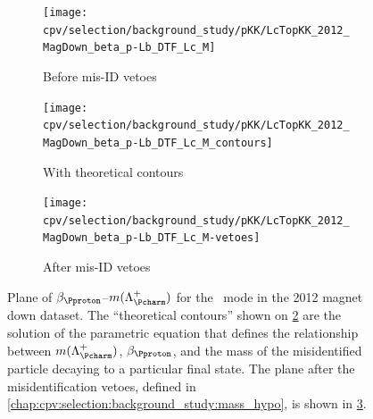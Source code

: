 \begin{figure}
  \begin{subfigure}[b]{0.5\textwidth}
    \texttt{[image: cpv/selection/background\_study/pKK/LcTopKK\_2012\_MagDown\_beta\_p-Lb\_DTF\_Lc\_M]}
    \caption{Before mis-ID vetoes}
    \label{fig:cpv:selection:background_study:mom_asym:pKK:before}
  \end{subfigure}
  \begin{subfigure}[b]{0.5\textwidth}
    \texttt{[image: cpv/selection/background\_study/pKK/LcTopKK\_2012\_MagDown\_beta\_p-Lb\_DTF\_Lc\_M\_contours]}
    \caption{With theoretical contours}
    \label{fig:cpv:selection:background_study:mom_asym:pKK:contours}
  \end{subfigure}
  \begin{subfigure}[b]{0.5\textwidth}
    \texttt{[image: cpv/selection/background\_study/pKK/LcTopKK\_2012\_MagDown\_beta\_p-Lb\_DTF\_Lc\_M-vetoes]}
    \caption{After mis-ID vetoes}
    \label{fig:cpv:selection:background_study:mom_asym:pKK:after}
  \end{subfigure}
  \caption{%
    Plane of $\beta_{\Pproton}$--$m(\PLambdac)$ for the \pKK\ mode in the 2012 
    magnet down dataset.
    The ``theoretical contours'' shown on 
    \cref{fig:cpv:selection:background_study:mom_asym:pKK:contours} are the 
    solution of the parametric equation that defines the relationship between 
    $m(\PLambdac)$, $\beta_{\Pproton}$, and the mass of the misidentified 
    particle decaying to a particular final state.
    The plane after the misidentification vetoes, defined in 
    \cref{chap:cpv:selection:background_study:mass_hypo}, is shown in 
    \cref{fig:cpv:selection:background_study:mom_asym:pKK:after}.
  }
  \label{fig:cpv:selection:background_study:mom_asym:pKK}
\end{figure}

